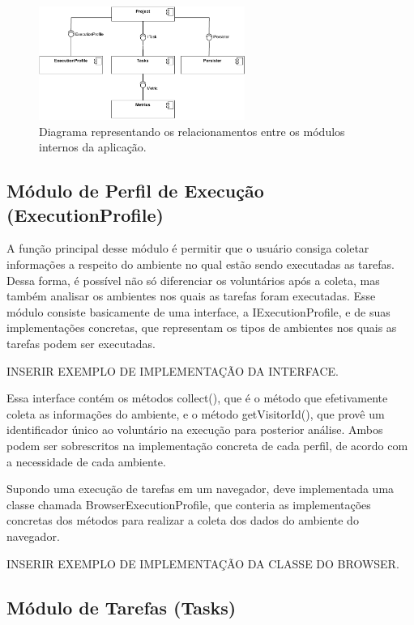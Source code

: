 \documentclass[12pt]{tcc}
\begin{document}
\begin{figure}[!ht]
	\centering
	\includegraphics[width=0.6\textwidth]{figures/diagramaarquiteturaelchupacabra.pdf}
	\caption{Diagrama representando os relacionamentos entre os módulos internos da aplicação.}
	\label{fig:diagrama-arquitetura}
\end{figure}

\subsection{Módulo de Perfil de Execução (ExecutionProfile)}

A função principal desse módulo é permitir que o usuário consiga coletar informações a respeito do ambiente no qual estão sendo executadas as tarefas. Dessa forma, é possível não só diferenciar os voluntários após a coleta, mas também analisar os ambientes nos quais as tarefas foram executadas. Esse módulo consiste basicamente de uma interface, a IExecutionProfile, e de suas implementações concretas, que representam os tipos de ambientes nos quais as tarefas podem ser executadas. 

{{INSERIR EXEMPLO DE IMPLEMENTAÇÃO DA INTERFACE}}.

Essa interface contém os métodos collect(), que é o método que efetivamente coleta as informações do ambiente, e o método getVisitorId(), que provê um identificador único ao voluntário na execução para posterior análise. Ambos podem ser sobrescritos na implementação concreta de cada perfil, de acordo com a necessidade de cada ambiente.

Supondo uma execução de tarefas em um navegador, deve implementada uma classe chamada BrowserExecutionProfile, que conteria as implementações concretas dos métodos para realizar a coleta dos dados do ambiente do navegador.

{{INSERIR EXEMPLO DE IMPLEMENTAÇÃO DA CLASSE DO BROWSER}}.

\subsection{Módulo de Tarefas (Tasks)}
\end{document}
